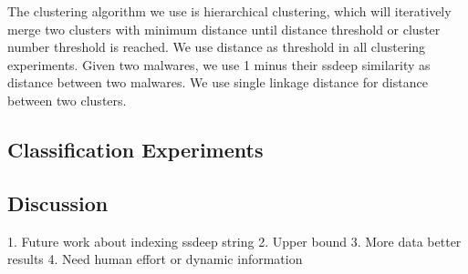 The clustering algorithm we use is hierarchical clustering, 
which will iteratively merge two clusters with minimum distance until distance threshold or cluster number threshold is reached. 
We use distance as threshold in all clustering experiments. 
Given two malwares, we use 1 minus their ssdeep similarity as distance between two malwares. 
We use single linkage distance for distance between two clusters. 



\subsection{Classification Experiments}


\subsection{Discussion}
1. Future work about indexing ssdeep string
2. Upper bound
3. More data better results
4. Need human effort or dynamic information 